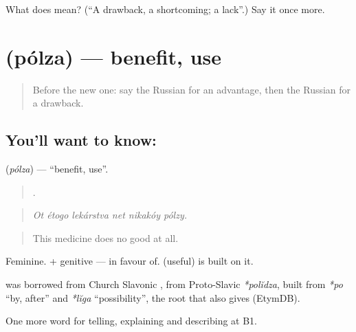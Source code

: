 \begin{tcolorbox}[breakable,colback=teal!4,colframe=teal!35!black,title={Before you move on}]
What does  mean? (\textquotedblleft{}A drawback, a shortcoming; a lack\textquotedblright{}.) Say it once more.
\end{tcolorbox}
\section[\texorpdfstring{\ru{польза} (pólza)}{польза (pólza)}]{ (pólza) — benefit, use}

\label{lesson:RU-C346-polza}



\begin{quote}
Before the new one: say the Russian for an advantage, then the Russian for a drawback.
\end{quote}

\subsection*{You'll want to know: }
\textbf{} (\emph{pólza}) — \textquotedblleft{}benefit, use\textquotedblright{}.

\begin{quote}
     .
\end{quote}

\begin{quote}
\emph{Ot étogo lekárstva net nikakóy pólzy.}
\end{quote}

\begin{quote}
This medicine does no good at all.
\end{quote}

Feminine. \emph{ } + genitive — in favour of. \emph{} (useful) is built on it.

\begin{cousinweb}
\textbf{} was borrowed from Church Slavonic \emph{}, from Proto-Slavic \emph{*polĭdza}, built from \emph{*po} \textquotedblleft{}by, after\textquotedblright{} and \emph{*lĭga} \textquotedblleft{}possibility\textquotedblright{}, the root that also gives \emph{} (EtymDB).
\end{cousinweb}

\begin{grammarlens}[title={What you've built}]
One more word for telling, explaining and describing at B1.
\end{grammarlens}

